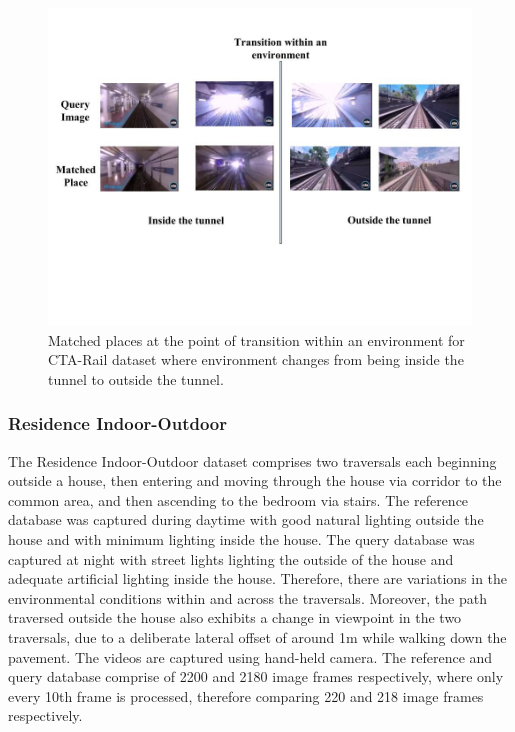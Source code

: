 \documentclass[letterpaper, 10 pt, conference]{ieeeconf}  %
\begin{document}
\begin{figure}
\centering
 \includegraphics[clip, trim=0.5cm 8cm 1cm 2.5cm,scale=0.25]{PlaceMatchesAtTransition}
 \caption{Matched places at the point of transition within an environment for CTA-Rail dataset where environment changes from being inside the tunnel to outside the tunnel.}
 \label{fig:placeMatches}
\end{figure}

\subsubsection{Residence Indoor-Outdoor}
The Residence Indoor-Outdoor dataset comprises two traversals each beginning outside a house, then entering and moving through the house via corridor to the common area, and then ascending to the bedroom via stairs. The reference database was captured during daytime with good natural lighting outside the house and with minimum lighting inside the house. The query database was captured at night with street lights lighting the outside of the house and adequate artificial lighting inside the house. Therefore, there are variations in the environmental conditions within and across the traversals. Moreover, the path traversed outside the house also exhibits a change in viewpoint in the two traversals, due to a deliberate lateral offset of around 1m while walking down the pavement. The videos are captured using hand-held camera. The reference and query database comprise of 2200 and 2180 image frames respectively, where only every 10th frame is processed, therefore comparing 220 and 218 image frames respectively.
\end{document}
